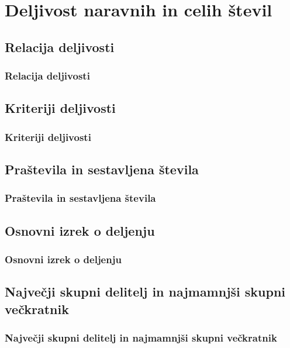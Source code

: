 \section{Deljivost naravnih in celih števil}

\begin{frame}
    \sectionpage
\end{frame}

\begin{frame}
\end{frame}

    \subsection{Relacija deljivosti}

        \begin{frame}
            \frametitle{Relacija deljivosti}
        \end{frame}

    \subsection{Kriteriji deljivosti}

        \begin{frame}
            \frametitle{Kriteriji deljivosti}
        \end{frame}

    \subsection{Praštevila in sestavljena števila}

        \begin{frame}
            \frametitle{Praštevila in sestavljena števila}
        \end{frame}

    \subsection{Osnovni izrek o deljenju}

        \begin{frame}
            \frametitle{Osnovni izrek o deljenju}
        \end{frame}

    \subsection{Največji skupni delitelj in najmamnjši skupni večkratnik}

        \begin{frame}
            \frametitle{Največji skupni delitelj in najmamnjši skupni večkratnik}
        \end{frame}


